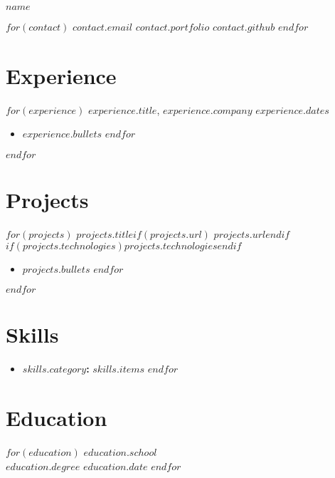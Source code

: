 \documentclass[11pt]{article}
\newcommand{\entrytitle}[1]{\vspace{0.5em}\textbf{#1}}
\begin{document}
\centerline{\Huge{$name$}}

\centerline{$for(contact)$
  $contact.email$ \textbar{} $contact.portfolio$ \textbar{} $contact.github$
$endfor$}

\section{Experience}
$for(experience)$
\entrytitle{$experience.title$}, $experience.company$ \hfill $experience.dates$ \\
\begin{itemize}
$for(experience.bullets)$
    \item $experience.bullets$
$endfor$
\end{itemize}
$endfor$

\section{Projects}
$for(projects)$
\entrytitle{$projects.title$}$if(projects.url)$ \hfill $projects.url$$endif$ \\
$if(projects.technologies)$\textit{$projects.technologies$}$endif$
\begin{itemize}
$for(projects.bullets)$
    \item $projects.bullets$
$endfor$
\end{itemize}
$endfor$

\section{Skills}
\begin{itemize}[label={},leftmargin=0em]
$for(skills)$
    \item \textbf{$skills.category$:} $skills.items$
$endfor$
\end{itemize}

\section{Education}
$for(education)$
\textbf{$education.school$} \\
$education.degree$ \hfill $education.date$
$endfor$
\end{document}
